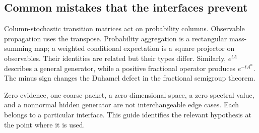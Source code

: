 \subsection{Common mistakes that the interfaces prevent}
Column-stochastic transition matrices act on probability columns. Observable propagation uses the transpose. Probability aggregation is a rectangular mass-summing map; a weighted conditional expectation is a square projector on observables. Their identities are related but their types differ. Similarly, $e^{tA}$ describes a general generator, while a positive fractional operator produces $e^{-tA^\alpha}$. The minus sign changes the Duhamel defect in the fractional semigroup theorem.

Zero evidence, one coarse packet, a zero-dimensional space, a zero spectral value, and a nonnormal hidden generator are not interchangeable edge cases. Each belongs to a particular interface. This guide identifies the relevant hypothesis at the point where it is used.
